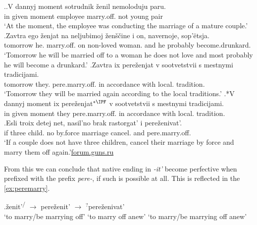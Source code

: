 \ex.\ag.\label{ex:peremarry1}V dannyj moment sotrudnik \v{z}enil\textsuperscript{\IPF} nemoloduju paru.\\
in given moment employee marry.off. {not young} pair\\
\trans `At the moment, the employee was conducting the marriage of a mature couple.'
\bg.\label{ex:peremarry2}Zavtra ego \v{z}enjat\textsuperscript{\PF} na neljubimoj \v{z}en\v{s}\v{c}ine i on, navernoje, sop'\"{e}tsja.\\
tomorrow he. marry.off. on non-loved woman. and he probably {become.drunkard.}\\
\trans `Tomorrow he will be married off to a woman he does not love and most probably he will become a drunkard.'
\bg.\label{ex:peremarry3}Zavtra ix pere\v{z}enjat\textsuperscript{\PF} v sootvetstvii s mestnymi tradicijami.\\
tomorrow they. pere.marry.off. in accordance with local. tradition.\\
\trans `Tomorrow they will be married again according to the local traditions.'
\bg.*V dannyj moment ix pere\v{z}enjat$^{*{\IPF}}$ v sootvetstvii s mestnymi tradicijami.\label{ex:peremarry4}\\
in given moment they pere.marry.off. in accordance with local. tradition.\\

\exg.\label{ex:perezenivat'}Esli troix detej net, nasil'no brak rastorgat' i pere\v{z}enivat'.\\
if three child. no by.force marriage cancel. and pere.marry.off.\\
\trans `If a couple does not have three children, cancel their marriage by force and marry them off again.'\hbox{}\hfill\hbox{\url{forum.guns.ru}}

From this we can conclude that native  ending in \textit{-it'} become perfective when prefixed with the  prefix \textit{pere-}, if such  is possible at all. This is reflected in the  \ref{ex:peremarry}.

\exg.\label{ex:peremarry}\v{z}enit'\textsuperscript{\IPF\slash\PF} $\rightarrow$ pere\v{z}enit'\textsuperscript{\PF} $\rightarrow$ $^?$pere\v{z}enivat'\textsuperscript{\IPF} \\
{`to marry/be marrying off'} {} {`to marry off anew'} {} {`to marry/be marrying off anew'}\\

